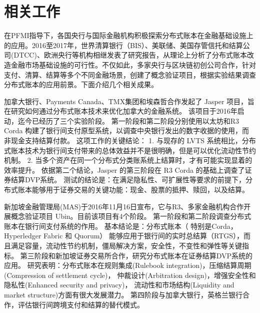 \section{相关工作}\label{sec:related}

在PFMI指导下，各国央行与国际金融机构积极探索分布式账本在金融基础设施上的应用。2016至2017年，世界清算银行（BIS）\cite{bis_dlt}、美联储\cite{fr}、美国存管信托和结算公司(DTCC)\cite{dtcc2016}、欧洲央行\cite{euro}等机构相继发表了研究报告，从理论上分析了分布式账本改造金融市场基础设施的可行性。不仅如此，多家央行与区块链初创公司合作，针对支付、清算、结算等多个不同金融场景，创建了概念验证项目，根据实验结果调查分布式账本的应用前景。下面介绍几个相关成果。

加拿大银行、Payments Canada、TMX集团和埃森哲合作发起了 Jasper 项目，旨在研究如何通过分布式账本技术来优化加拿大的金融系统。
该项目于2016年启动，迄今已经历了三个实验阶段。
第一阶段和第二阶段\cite{jasper2}分别使用以太坊和R3 Corda 构建了银行间支付原型系统，以调查中央银行发出的数字收据的使用，而非现金支持结算付款。
这项工作的关键结论：
1. 与现存的 LVTS 系统相比，分布式账本技术为银行间支付带来的总体效益并不是很明确，但是可以优化流动性节约机制。
2. 当多个资产在同一个分布式分类账系统上结算时，才有可能实现显着的效率提升。
依据第二个结论，Jasper 的第三阶段\cite{jasper3}在 R3 Corda 的基础上调查了证券结算DVP系统。
测试的结论是：在满足隐私性、可扩展性等要求的前提下，分布式账本能够用于证券交易的关键功能：现金、股票的抵押、赎回，以及结算。


新加坡金融管理局(MAS)于2016年11月16日宣布，它与R3、多家金融机构合作开展概念验证项目 Ubin。目前该项目有4个阶段。
第一阶段\cite{mas1}和第二阶段\cite{mas2}调查分布式账本在银行间支付系统的作用。
基本结论是：分布式账本（ 特别是Corda，Hyperledger Fabric 和 Quorum） 能够应用于银行间的实时总结算（RTGS），而且满足容量，流动性节约机制，僵局解决方案，安全性，不变性和弹性等关键指标。
第三阶段\cite{mas3}和新加坡证券交易所合作，研究分布式账本在证券结算DVP系统的应用。
研究表明：分布式账本在规则集成(Rulebook integration)，压缩结算周期(Compression of settlement cycle)，
仲裁设计(Arbitration design)，增强安全性和隐私性(Enhanced security and privacy)，
流动性和市场结构(Liquidity and market structure)方面有很大发展潜力。
第四阶段\cite{mas4}与加拿大银行，英格兰银行合作，评估银行间跨境支付和结算的替代模式。

